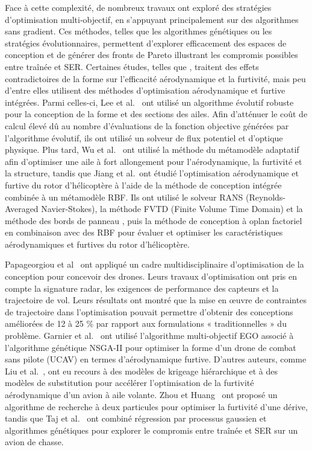 Face à cette complexité, de nombreux travaux ont exploré des stratégies d'optimisation multi-objectif, en s'appuyant principalement sur des algorithmes sans gradient. Ces méthodes, telles que les algorithmes génétiques ou les stratégies évolutionnaires, permettent d'explorer efficacement des espaces de conception et de générer des fronts de Pareto illustrant les compromis possibles entre traînée et SER.
Certaines études, telles que \citep{Aliaga2022}, traitent des effets contradictoires de la forme sur l'efficacité aérodynamique et la furtivité, mais peu d'entre elles utilisent des méthodes d'optimisation aérodynamique et furtive intégrées. Parmi celles-ci, Lee et al.~\citep{Lee2007} ont utilisé un algorithme évolutif robuste pour la conception de la forme et des sections des ailes. Afin d'atténuer le coût de calcul élevé dû au nombre d'évaluations de la fonction objective générées par l'algorithme évolutif, ils ont utilisé un solveur de flux potentiel et d'optique physique. Plus tard, Wu et al.~\citep{Wu2014} ont utilisé la méthode du métamodèle adaptatif afin d'optimiser une aile à fort allongement pour l'aérodynamique, la furtivité et la structure, tandis que Jiang et al.~ont étudié l'optimisation aérodynamique et furtive du rotor d'hélicoptère à l'aide de la méthode de conception intégrée combinée à un métamodèle RBF. Ils ont utilisé le solveur RANS (Reynolds-Averaged Navier-Stokes), la méthode FVTD (Finite Volume Time Domain) et la méthode des bords de panneau \citep{Jiang2015}, puis la méthode de conception à oplan factoriel en combinaison avec des RBF \citep{Jiang2016} pour évaluer et optimiser les caractéristiques aérodynamiques et furtives du rotor d'hélicoptère.

Papageorgiou et al~\citep{Papageorgiou2018} ont appliqué un cadre multidisciplinaire d'optimisation de la conception pour concevoir des drones. Leurs travaux d'optimisation ont pris en compte la signature radar, les exigences de performance des capteurs et la trajectoire de vol. Leurs résultats ont montré que la mise en œuvre de contraintes de trajectoire dans l'optimisation pouvait permettre d'obtenir des conceptions améliorées de 12 à 25 \% par rapport aux formulations « traditionnelles » du problème. Garnier et al.~\citep{Garnier2020} ont utilisé l'algorithme multi-objectif EGO associé à l'algorithme génétique NSGA-II \citep{Guerra2016} pour optimiser la forme d'un drone de combat sans pilote (UCAV) en termes d'aérodynamique furtive. D'autres auteurs, comme Liu et al.~\citep{Liu2021}, ont eu recours à des modèles de krigeage hiérarchique et à des modèles de substitution pour accélérer l'optimisation de la furtivité aérodynamique d'un avion à aile volante. Zhou et Huang~\citep{Zhou2023} ont proposé un algorithme de recherche à deux particules pour optimiser la furtivité d'une dérive, tandis que Taj et al.~\citep{Taj2023} ont combiné régression par processus gaussien et algorithmes génétiques pour explorer le compromis entre traînée et SER sur un avion de chasse.

